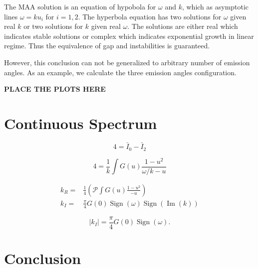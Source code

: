 \documentclass[%
 reprint,
 amsmath,amssymb,
 aps,
 prd
]{revtex4-1}
\begin{document}
The MAA solution is an equation of hypobola for $\omega$ and $k$, which as asymptotic lines $\omega = k u_i$ for $i=1,2$. The hyperbola equation has two solutions for $\omega$ given real $k$ or two solutions for $k$ given real $\omega$. The solutions are either real which indicates stable solutions or complex which indicates exponential growth in linear regime. Thus the equivalence of gap and instabilities is guaranteed.

However, this conclusion can not be generalized to arbitrary number of emission angles. As an example, we calculate the three emission angles configuration.

{\color{red}\bf PLACE THE PLOTS HERE}


\section{\label{sec-continuous-spectrum}Continuous Spectrum}



\begin{equation}
   4 = \bar I_0 - \bar I_2
\end{equation}

\begin{equation}
   4 = \frac{1}{k} \int G(u) \frac{ 1 - u^2 }{ \omega/k - u }
\end{equation}

\begin{align}
k_R =& \frac{1}{4}\left(  \mathscr P \int G(u) \frac{ 1 - u^2 }{  - u }  \right) \\
k_I =&  \frac{\pi}{4}G(0) \operatorname{Sign}\left( \omega \right) \operatorname{Sign}\left(  \operatorname{Im}(k)  \right)
\end{align}


\begin{equation}
   \lvert k_I \rvert  =  \frac{\pi}{4}G(0) \operatorname{Sign}\left( \omega \right).
\end{equation}


\section{\label{sec-conclusion}Conclusion}
\end{document}
